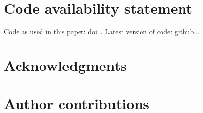 \documentclass[9pt,biorxiv,lineno,onehalfspacing]{lapreprint}
\begin{document}
\section{Code availability statement}

Code as used in this paper: doi...
Latest version of code: github...

\section{Acknowledgments}

\section{Author contributions}




\printbibliography

\if@endfloat\clearpage\processdelayedfloats\clearpage\fi 


\begin{appendix}

%    
%
%    

\end{appendix}


\end{document}
